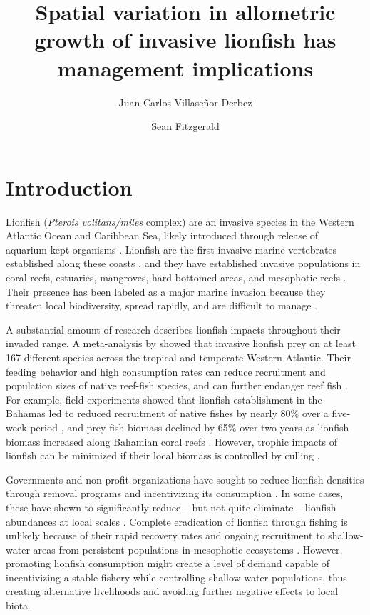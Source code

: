 \documentclass[fleqn,10pt,lineno]{wlpeerj} %
\title{Spatial variation in allometric growth of invasive lionfish has
management implications}
\author[1]{Juan Carlos Villaseñor-Derbez}
\author[1]{Sean Fitzgerald}
\affil[1]{Bren School of Environmental Sciences and Management, University of California
  Santa Barbara, Santa Barbara, California, USA}
\begin{document}
\flushbottom
\maketitle
\thispagestyle{empty}

\section*{Introduction}

Lionfish (\emph{Pterois volitans/miles} complex) are an invasive species
in the Western Atlantic Ocean and Caribbean Sea, likely introduced
through release of aquarium-kept organisms \citep{betancurr_2011}.
Lionfish are the first invasive marine vertebrates established along
these coasts \citep{schofield_2009,schofield_2010,sabidoitza_2016}, and
they have established invasive populations in coral reefs, estuaries,
mangroves, hard-bottomed areas, and mesophotic reefs
\citep{barbour_2010,jud_2011,muoz_2011,claydon_2012,andradibrown_2017,gress_2017}.
Their presence has been labeled as a major marine invasion because they
threaten local biodiversity, spread rapidly, and are difficult to manage
\citep{hixon_2016}.

A substantial amount of research describes lionfish impacts throughout
their invaded range. A meta-analysis by \citet{peake_2018} showed that
invasive lionfish prey on at least 167 different species across the
tropical and temperate Western Atlantic. Their feeding behavior and high
consumption rates can reduce recruitment and population sizes of native
reef-fish species, and can further endanger reef fish
\citep[][but see \citealt{hackerott_2017} for a counterexample]{green_2012,rocha_2015}.
For example, field experiments showed that lionfish establishment in the
Bahamas led to reduced recruitment of native fishes by nearly 80\% over
a five-week period \citep{albins_2008}, and prey fish biomass declined
by 65\% over two years as lionfish biomass increased along Bahamian
coral reefs \citep{green_2012}. However, trophic impacts of lionfish can
be minimized if their local biomass is controlled by culling
\citep{ariasgonzalez_2011}.

Governments and non-profit organizations have sought to reduce lionfish
densities through removal programs and incentivizing its consumption
\citep{chin_2016}. In some cases, these have shown to significantly
reduce -- but not quite eliminate -- lionfish abundances at local scales
\citep{deleon_2013,sandel_2015}. Complete eradication of lionfish
through fishing is unlikely because of their rapid recovery rates and
ongoing recruitment to shallow-water areas from persistent populations
in mesophotic ecosystems \citep{barbour_2011,andradibrown_2017}.
However, promoting lionfish consumption might create a level of demand
capable of incentivizing a stable fishery while controlling
shallow-water populations, thus creating alternative livelihoods and
avoiding further negative effects to local biota.
\end{document}
